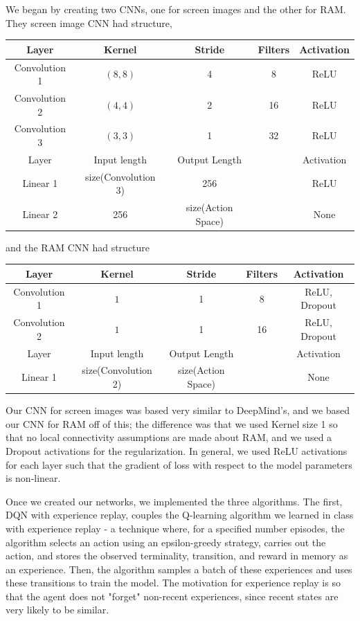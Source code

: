 \documentclass[11pt]{article}
\begin{document}
We began by creating two CNNs, one for screen images and the other for RAM. They screen image CNN had structure,
\begin{center}
\begin{tabular}{ c c c c c }
 Layer          & Kernel    & Stride    & Filters   & Activation    \\ \hline
 Convolution 1  & $(8,8)$   & 4         & 8         & ReLU          \\
 Convolution 2  & $(4,4)$   & 2         & 16        & ReLU          \\
 Convolution 3  & $(3,3)$   & 1         & 32        & ReLU          \\ \hline\hline
 Layer          & Input length          & Output Length     &  & Activation    \\ \hline
 Linear 1       & size(Convolution 3)   & 256               &  & ReLU          \\
 Linear 2       & 256                   & size(Action Space)&  & None
\end{tabular}
\end{center}
and the RAM CNN had structure
\begin{center}
\begin{tabular}{ c c c c c }
 Layer          & Kernel    & Stride    & Filters   & Activation    \\ \hline
 Convolution 1  & $1$       & 1         & 8         & ReLU, Dropout \\
 Convolution 2  & $1$       & 1         & 16        & ReLU, Dropout \\ \hline\hline
 Layer          & Input length          & Output Length     & & Activation    \\ \hline
 Linear 1       & size(Convolution 2)   & size(Action Space)& & None
\end{tabular}
\end{center}
Our CNN for screen images was based very similar to DeepMind's, and we based our CNN for RAM off of this; the difference was that we used Kernel size 1 so that no local connectivity assumptions are made about RAM, and we used a Dropout activations for the regularization. In general, we used ReLU activations for each layer such that the gradient of loss with respect to the model parameters is non-linear.

Once we created our networks, we implemented the three algorithms. The first, DQN with experience replay, couples the Q-learning algorithm we learned in class with experience replay - a technique where, for a specified number episodes, the algorithm selects an action using an epsilon-greedy strategy, carries out the action, and stores the observed terminality, transition, and reward in memory as an experience. Then, the algorithm samples a batch of these experiences and uses these transitions to train the model. The motivation for experience replay is so that the agent does not "forget" non-recent experiences, since recent states are very likely to be similar.
\end{document}
